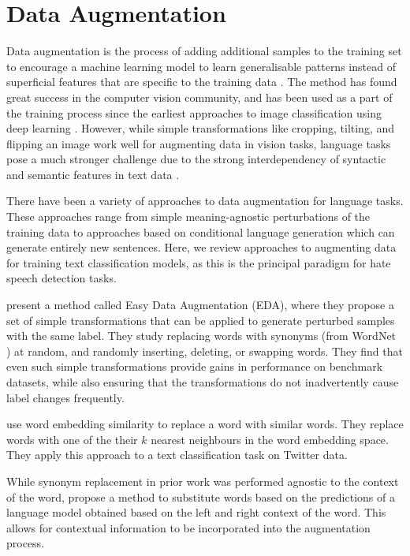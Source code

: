 \documentclass[11pt,a4paper]{article}
\begin{document}
\section{Data Augmentation}
Data augmentation is the process of adding additional samples to the training set to encourage a machine learning model to learn generalisable patterns instead of superficial features that are specific to the training data \cite{jha2020does}. The method has found great success in the computer vision community, and has been used as a part of the training process since the earliest approaches to image classification using deep learning \cite{AlexNet}. However, while simple transformations like cropping, tilting, and flipping an image work well for augmenting data in vision tasks, language tasks pose a much stronger challenge due to the strong interdependency of syntactic and semantic features in text data \cite{liu-etal-2020-data}.

There have been a variety of approaches to data augmentation for language tasks. These approaches range from simple meaning-agnostic perturbations of the training data to approaches based on conditional language generation which can generate entirely new sentences. Here, we review approaches to augmenting data for training text classification models, as this is the principal paradigm for hate speech detection tasks.

\citet{wei-zou-2019-eda} present a method called Easy Data Augmentation (EDA), where they propose a set of simple transformations that can be applied to generate perturbed samples with the same label. They study replacing words with synonyms (from WordNet \cite{WordNet}) at random, and randomly inserting, deleting, or swapping words. They find that even such simple transformations provide gains in performance on benchmark datasets, while also ensuring that the transformations do not inadvertently cause label changes frequently.

\citet{wang-yang-2015-thats} use word embedding similarity to replace a word with similar words. They replace words with one of the their $k$ nearest neighbours in the word embedding space. They apply this approach to a text classification task on Twitter data.

While synonym replacement in prior work was performed agnostic to the context of the word, \citet{kobayashi-2018-contextual} propose a method to substitute words based on the predictions of a language model obtained based on the left and right context of the word. This allows for contextual information to be incorporated into the augmentation process.
\end{document}
